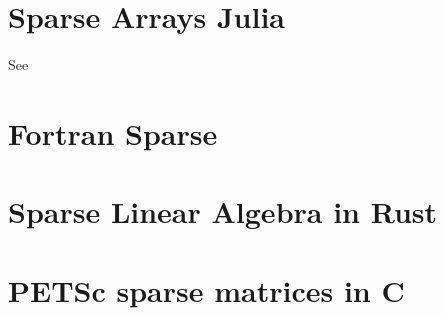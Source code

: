 \section{Sparse Arrays Julia}

See \href{https://robertsweeneyblanco.github.io/Programming_for_Mathematical_Applications/content/Sparse_Matrices/Sparse_Matrices_In_Julia.html}{}

\section{Fortran Sparse}

\section{Sparse Linear Algebra in Rust}


\section{PETSc sparse matrices in C}
